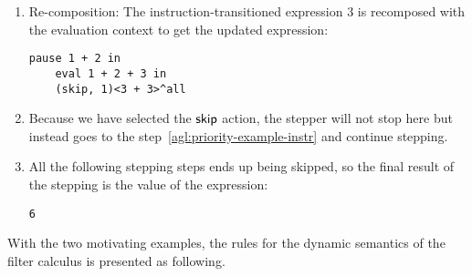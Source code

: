 \begin{enumerate}
  \item Re-composition: The instruction-transitioned expression \(3\) is recomposed with the evaluation context to get the updated expression:
  \begin{lstlisting}[language=hazel]
    pause 1 + 2 in
    eval 1 + 2 + 3 in
    (skip, 1)<3 + 3>^all
  \end{lstlisting}

  \item Because we have selected the \(\mathsf{skip}\) action, the stepper will not stop here but instead goes to the step~\ref{agl:priority-example-instr} and continue stepping.

  \item All the following stepping steps ends up being skipped, so the final result of the stepping is the value of the expression:
  \begin{lstlisting}[language=hazel]
    6
  \end{lstlisting}
\end{enumerate}

With the two motivating examples, the rules for the dynamic semantics of the filter calculus is presented as following.

